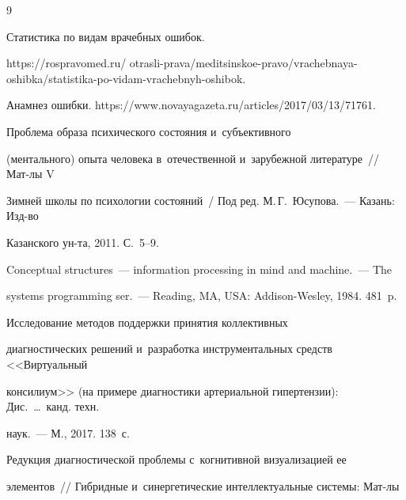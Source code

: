   

{\small\frenchspacing

{%


\begin{thebibliography}{9}



\vspace*{-2pt}




 Статистика по видам врачебных ошибок. 

{\sf https://rospravomed.ru/ otrasli-prava/meditsinskoe-pravo/vrachebnaya-oshibka/statistika-po-vidam-vrachebnyh-oshibok.}


Анамнез ошибки. {\sf https://www.novayagazeta.ru/articles/2017/03/13/71761}.


 Проблема образа психического состояния и~субъективного 

(ментального) опыта человека в~отечественной и~зарубежной литературе~/\!\!/ Мат-лы V 

Зимней школы по психологии состояний~/ Под ред. М.\,Г.~Юсупова.~--- Казань: Изд-во 

Казанского ун-та, 2011. С.~5--9.


 Conceptual structures~--- information processing in mind and machine.~--- The 

systems programming ser.~--- Reading, MA, USA: Addison-Wesley, 1984. 481~p.


 Исследование методов поддержки принятия коллективных 

диагностических решений и~разработка инструментальных средств <<Виртуальный 

консилиум>> (на примере диагностики артериальной гипертензии): Дис.\ \ldots\ канд. техн. 

наук.~--- М., 2017. 138~с.


 Редукция диагностической проблемы с~когнитивной визуализацией ее 

элементов~/\!\!/ Гибридные и~синергетические интеллектуальные системы: Мат-лы 


\end{thebibliography}}}
